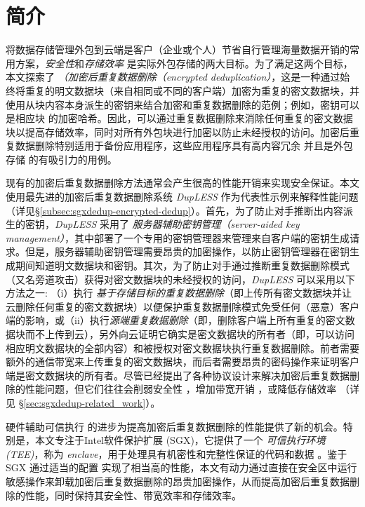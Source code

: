 \section{简介}
\label{sec:sgxdedup-introduction}

将数据存储管理外包到云端是客户（企业或个人）节省自行管理海量数据开销的常用方案，\textit{安全性}和\textit{存储效率} 是实际外包存储的两大目标。为了满足这两个目标，本文探索了 \textit{（加密后重复数据删除（encrypted deduplication）}，这是一种通过始终将重复的明文数据块（来自相同或不同的客户端）加密为重复的密文数据块，并使用从块内容本身派生的密钥来结合加密和重复数据删除的范例；例如，密钥可以是相应块 \cite{douceur2002reclaiming} 的加密哈希。因此，可以通过重复数据删除来消除任何重复的密文数据块以提高存储效率，同时对所有外包块进行加密以防止未经授权的访问。加密后重复数据删除特别适用于备份应用程序，这些应用程序具有高内容冗余 \cite{wallace12} 并且是外包存储 \cite{hasan05,kotla07,varble09} 的有吸引力的用例。
  
现有的加密后重复数据删除方法通常会产生很高的性能开销来实现安全保证。本文使用最先进的加密后重复数据删除系统 {\em DupLESS} \cite{bellare2013DupLESS} 作为代表性示例来解释性能问题（详见\S\ref{subsec:sgxdedup-encrypted-dedup}）。首先，为了防止对手推断出内容派生的密钥，{\em DupLESS} 采用了 \textit{服务器辅助密钥管理（server-aided key management）}，其中部署了一个专用的密钥管理器来管理来自客户端的密钥生成请求。但是，服务器辅助密钥管理需要昂贵的加密操作，以防止密钥管理器在密钥生成期间知道明文数据块和密钥。其次，为了防止对手通过推断重复数据删除模式（又名旁道攻击\cite{harnik2010side, halevi2011proofs}）获得对密文数据块的未经授权的访问，{\em DupLESS} 可以采用以下方法之一: （i）执行 \textit{基于存储目标的重复数据删除}（即上传所有密文数据块并让云删除任何重复的密文数据块）以便保护重复数据删除模式免受任何（恶意）客户端的影响，或（ii）执行\textit{源端重复数据删除}（即，删除客户端上所有重复的密文数据块而不上传到云），另外向云证明它确实是密文数据块的所有者（即，可以访问相应明文数据块的全部内容）和被授权对密文数据块执行重复数据删除。前者需要额外的通信带宽来上传重复的密文数据块，而后者需要昂贵的密码操作来证明客户端是密文数据块的所有者。尽管已经提出了各种协议设计来解决加密后重复数据删除的性能问题，但它们往往会削弱安全性 \cite{li20b,xu2013weak,pietro12}，增加带宽开销 \cite{harnik10,li15}，或降低存储效率 \cite{zhou2015secdep, qin17,li20b}（详见 \S\ref{sec:sgxdedup-related_work}）。
  
硬件辅助可信执行 \cite{trustzone,sgx,MK-TME,AMDSEV} 的进步为提高加密后重复数据删除的性能提供了新的机会。特别是，本文专注于Intel软件保护扩展 (SGX)，它提供了一个 \textit{ 可信执行环境 (TEE)}，称为 \textit{ enclave}，用于处理具有机密性和完整性保证的代码和数据 \cite{baumann2014Shielding }。鉴于 SGX 通过适当的配置 \cite{harnik18} 实现了相当高的性能，本文有动力通过直接在安全区中运行敏感操作来卸载加密后重复数据删除的昂贵加密操作，从而提高加密后重复数据删除的性能，同时保持其安全性、带宽效率和存储效率。

